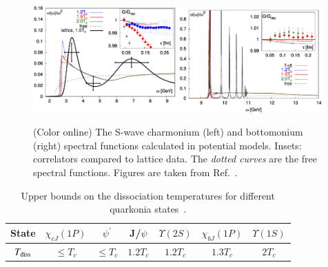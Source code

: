\begin{figure}[]
   \begin{center}
      {\includegraphics[width=0.49\textwidth]{Figures/Fig16l_JPsi_SpecFuncLattQCD.png}}
      {\includegraphics[width=0.49\textwidth]{Figures/Fig16r_Y1S_SpecFuncLattQCD.png}}
      \caption{(Color online) The S-wave charmonium (left) and 
        bottomonium (right) spectral 
        functions calculated in potential 
        models. 
        Insets: correlators compared to lattice data.  
        The {\it dotted curves} are the
        free spectral functions. Figures are taken from Ref.~\cite{Mocsy:2007yj}.
      }
      \label{Fig:QuarkoniaSpecFuncLattice} 
   \end{center}
\end{figure}





\begin{table}[tb]
   \caption{Upper bounds on the dissociation 
             temperatures for different quarkonia states~\cite{Mocsy:2007jz}.
             }
   \label{tab:LatticeDissTemp}
   \setlength{\tabcolsep}{0.41pc}
   \begin{center}
      \begin{tabular}{ccccccc}
      \hline\hline
      State & $\chi_{cJ}(1P)$ & $\psi^{'}$ &J/$\psi$  &$\Upsilon(2S)$ & $\chi_{bJ}(1P)$ &$\Upsilon(1S)$ \\%
      \hline 
      $T_{\rm diss}$ & $\le T_c$ & $\le T_c$ & $1.2T_c$ & $1.2T_c$ & $1.3T_c$ & $2T_c$\\ 
\hline\hline
\end{tabular}
\end{center}
\end{table}



